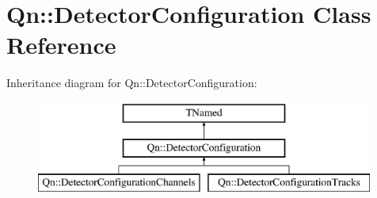 \hypertarget{classQn_1_1DetectorConfiguration}{}\section{Qn\+:\+:Detector\+Configuration Class Reference}
\label{classQn_1_1DetectorConfiguration}
Inheritance diagram for Qn\+:\+:Detector\+Configuration\+:\begin{figure}[H]
\begin{center}
\leavevmode
\includegraphics[height=3.000000cm]{classQn_1_1DetectorConfiguration}
\end{center}
\end{figure}
